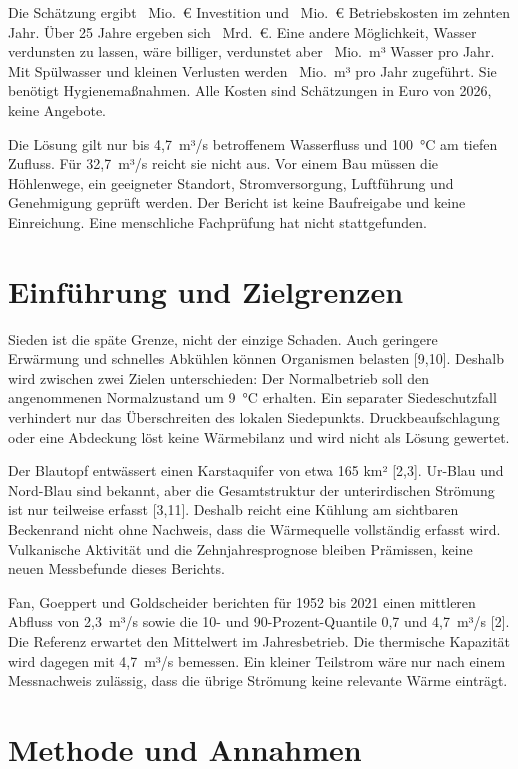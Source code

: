 Die Schätzung ergibt \CapexFinal~Mio.~€ Investition und \OpexFinal~Mio.~€ Betriebskosten im zehnten Jahr. Über 25 Jahre ergeben sich \NpvHybridFull~Mrd.~€. Eine andere Möglichkeit, Wasser verdunsten zu lassen, wäre billiger, verdunstet aber \EvapAnnual~Mio.~m³ Wasser pro Jahr. Mit Spülwasser und kleinen Verlusten werden \EvapMakeupAnnual~Mio.~m³ pro Jahr zugeführt. Sie benötigt Hygienemaßnahmen. Alle Kosten sind Schätzungen in Euro von 2026, keine Angebote.

Die Lösung gilt nur bis 4,7~m³/s betroffenem Wasserfluss und 100~°C am tiefen Zufluss. Für 32,7~m³/s reicht sie nicht aus. Vor einem Bau müssen die Höhlenwege, ein geeigneter Standort, Stromversorgung, Luftführung und Genehmigung geprüft werden. Der Bericht ist keine Baufreigabe und keine Einreichung. Eine menschliche Fachprüfung hat nicht stattgefunden.

\section{Einführung und Zielgrenzen}

Sieden ist die späte Grenze, nicht der einzige Schaden. Auch geringere Erwärmung und schnelles Abkühlen können Organismen belasten [9,10]. Deshalb wird zwischen zwei Zielen unterschieden: Der Normalbetrieb soll den angenommenen Normalzustand um 9~°C erhalten. Ein separater Siedeschutzfall verhindert nur das Überschreiten des lokalen Siedepunkts. Druckbeaufschlagung oder eine Abdeckung löst keine Wärmebilanz und wird nicht als Lösung gewertet.

Der Blautopf entwässert einen Karstaquifer von etwa 165 km² [2,3]. Ur-Blau und Nord-Blau sind bekannt, aber die Gesamtstruktur der unterirdischen Strömung ist nur teilweise erfasst [3,11]. Deshalb reicht eine Kühlung am sichtbaren Beckenrand nicht ohne Nachweis, dass die Wärmequelle vollständig erfasst wird. Vulkanische Aktivität und die Zehnjahresprognose bleiben Prämissen, keine neuen Messbefunde dieses Berichts.

Fan, Goeppert und Goldscheider berichten für 1952 bis 2021 einen mittleren Abfluss von 2,3~m³/s sowie die 10- und 90-Prozent-Quantile 0,7 und 4,7~m³/s [2]. Die Referenz erwartet den Mittelwert im Jahresbetrieb. Die thermische Kapazität wird dagegen mit 4,7~m³/s bemessen. Ein kleiner Teilstrom wäre nur nach einem Messnachweis zulässig, dass die übrige Strömung keine relevante Wärme einträgt.

\section{Methode und Annahmen}

